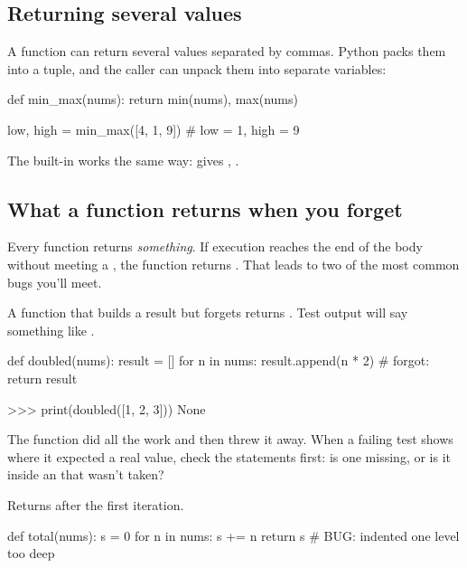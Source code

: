 \documentclass[10pt,a4paper]{article}
\begin{document}
\subsection{Returning several values}
A function can return several values separated by commas. Python packs them into a tuple, and the caller can unpack them into separate variables:
\begin{pycode}
def min_max(nums):
    return min(nums), max(nums)

low, high = min_max([4, 1, 9])    # low = 1, high = 9
\end{pycode}
The built-in  works the same way:  gives , .
\subsection{What a function returns when you forget }
Every function returns \emph{something}. If execution reaches the end of the body without meeting a , the function returns . That leads to two of the most common bugs you’ll meet.
\begin{trapbox}
A function that builds a result but forgets  returns . Test output will say something like .
\end{trapbox}
\begin{pycode}
def doubled(nums):
    result = []
    for n in nums:
        result.append(n * 2)
    # forgot: return result
\end{pycode}
\begin{txtcode}
>>> print(doubled([1, 2, 3]))
None
\end{txtcode}
The function did all the work and then threw it away. When a failing test shows  where it expected a real value, check the  statements first: is one missing, or is it inside an  that wasn’t taken?
\begin{trapbox}
Returns after the first iteration.
\end{trapbox}
\begin{pycode}
def total(nums):
    s = 0
    for n in nums:
        s += n
        return s     # BUG: indented one level too deep
\end{pycode}
\end{document}
